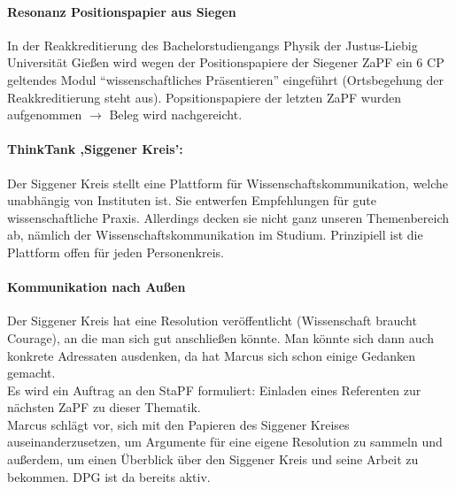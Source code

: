     \paragraph{Resonanz Positionspapier aus Siegen}
      In der Reakkreditierung des Bachelorstudiengangs Physik der Justus-Liebig Universität Gießen wird wegen der Positionspapiere
      der Siegener ZaPF ein 6 CP geltendes Modul ``wissenschaftliches Präsentieren'' eingeführt (Ortsbegehung der Reakkreditierung steht aus).
      Popsitionspapiere der letzten ZaPF wurden aufgenommen $\rightarrow$ Beleg wird nachgereicht.

    \paragraph{ThinkTank ,Siggener Kreis’:}
      Der Siggener Kreis stellt eine Plattform für Wissenschaftskommunikation, welche unabhängig von Instituten ist.
      Sie entwerfen Empfehlungen für gute wissenschaftliche Praxis. Allerdings decken sie nicht ganz unseren Themenbereich ab, nämlich der Wissenschaftskommunikation im Studium.
      Prinzipiell ist die Plattform offen für jeden Personenkreis.

    \paragraph{Kommunikation nach Außen}
      Der Siggener Kreis hat eine Resolution veröffentlicht (Wissenschaft braucht Courage), an die man sich gut anschließen könnte.
      Man könnte sich dann auch konkrete Adressaten ausdenken, da hat Marcus sich schon einige Gedanken gemacht. \\

      Es wird ein Auftrag an den StaPF formuliert: Einladen eines Referenten zur nächsten ZaPF zu dieser Thematik. \\

      Marcus schlägt vor, sich mit den Papieren des Siggener Kreises auseinanderzusetzen, um Argumente für eine eigene
      Resolution zu sammeln und außerdem, um einen Überblick über den Siggener Kreis und seine Arbeit zu bekommen.
      DPG ist da bereits aktiv. \\

